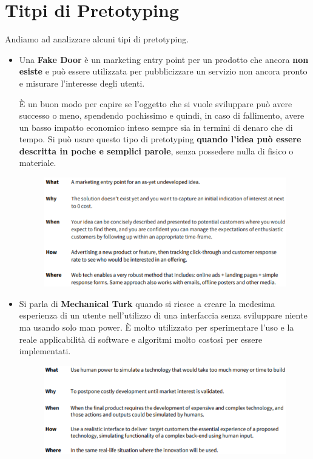 \documentclass[a4paper,11pt,oneside]{book}
\begin{document}
\section{Titpi di Pretotyping}
Andiamo ad analizzare alcuni tipi di pretotyping.
\begin{itemize}
	\item Una \textbf{Fake Door} è un marketing entry point per un prodotto che ancora \textbf{non esiste} e può essere utilizzata per pubblicizzare un servizio non ancora pronto e misurare l'interesse degli utenti.

	      È un buon modo per capire se l'oggetto che si vuole sviluppare può avere successo o meno, spendendo pochissimo e quindi, in caso di fallimento, avere un basso impatto economico inteso sempre sia in termini di denaro che di tempo. Si può usare
	      questo tipo di pretotyping \textbf{quando l'idea può essere descritta in poche e semplici parole}, senza possedere nulla di fisico o materiale.

	      \begin{figure}[!h]
		      \centering
		      \includegraphics[scale=0.42]{immagini/Fake_door.png}
	      \end{figure}

	\item Si parla di \textbf{Mechanical Turk} quando si riesce a creare la medesima esperienza di un utente nell'utilizzo di una interfaccia senza sviluppare niente ma usando solo man power. È molto utilizzato per sperimentare l'uso e la reale applicabilità di software e algoritmi molto costosi per essere implementati.

	      \begin{figure}[!h]
		      \centering
		      \includegraphics[scale=0.42]{immagini/Mechanical_turk.png}
	      \end{figure}


\end{itemize}
\end{document}
